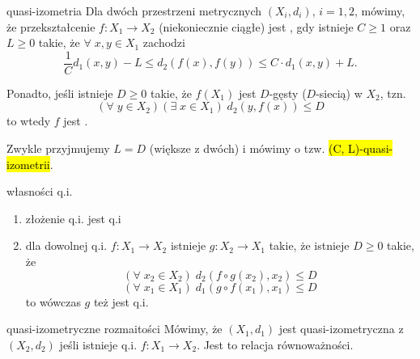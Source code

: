 \begin{definition}{quasi-izometria}{}
  Dla dwóch przestrzeni metrycznych $(X_i, d_i)$, $i=1,2$, mówimy, że przekształcenie $f:X_1\to X_2$ (niekoniecznie ciągłe) jest , gdy istnieje $C\geq 1$ oraz $L\geq 0$ takie, że $\forall\;x,y\in X_1$ zachodzi
  $$\frac{1}{C}d_1(x,y)-L\leq d_2(f(x),f(y))\leq C\cdot d_1(x,y)+L.$$

  Ponadto, jeśli istnieje $D\geq 0$ takie, że $f(X_1)$ jest $D$-gęsty ($D$-siecią) w $X_2$, tzn. 
  $$(\forall\;y\in X_2)(\exists\;x\in X_1)\;d_2(y, f(x))\leq D$$
  to wtedy $f$ jest .
\end{definition}

Zwykle przyjmujemy $L=D$ (większe z dwóch) i mówimy o tzw. \hl{(C, L)-quasi-izometrii}.

\begin{fact}{własności q.i.}{}
  \begin{enumerate}
    \item złożenie q.i. jest q.i
    \item dla dowolnej q.i. $f:X_1\to X_2$ istnieje $g:X_2\to X_1$ takie, że istnieje $D\geq 0$ takie, że
      $$(\forall\;x_2\in X_2)\;d_2(f\circ g(x_2), x_2)\leq D$$
      $$(\forall\;x_1\in X_1)\;d_1(g\circ f(x_1), x_1)\leq D$$
      to wówczas $g$ też jest q.i.
  \end{enumerate}
\end{fact}

\begin{definition}{quasi-izometryczne rozmaitości}{}
  Mówimy, że $(X_1, d_1)$ jest quasi-izometryczna z $(X_2, d_2)$ jeśli istnieje q.i. $f:X_1\to X_2$. Jest to relacja równoważności.
\end{definition}

